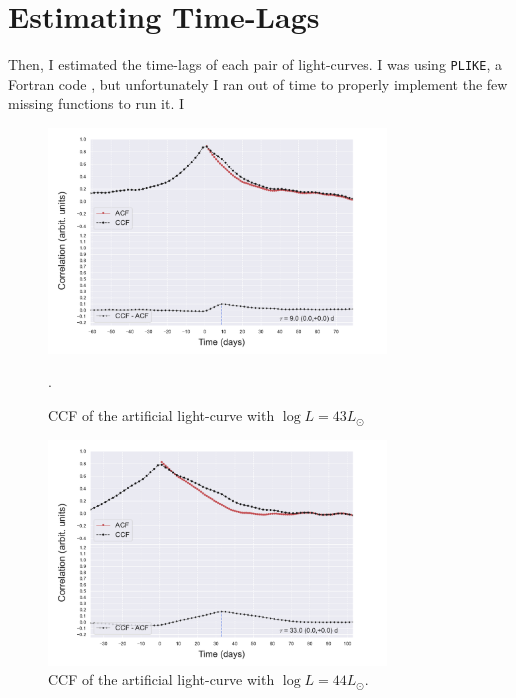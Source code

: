 \documentclass[letterpaper, oneside]{article}
\begin{document}
\section{Estimating Time-Lags}

Then, I estimated the time-lags of each pair of light-curves. I was using \texttt{PLIKE}, a Fortran code \cite{Alexander_2013, tal_alexander_software}, but unfortunately I ran out of time to properly implement the few missing functions to run it. I 

\begin{figure}[h]
	\centering
	\includegraphics[width=0.8\textwidth]{../x_y_bands_43_final.pdf}
	\caption{CCF of the artificial light-curve with $\log L = 43 L_{\odot}$}.
	\label{fig:ccf_art_lcs_L43}
\end{figure}

\begin{figure}[p]
	\centering
	\includegraphics[width=0.8\textwidth]{../x_y_bands_44_final.pdf}
	\caption{CCF of the artificial light-curve with $\log L = 44 L_{\odot}$.}
	\label{fig:ccf_art_lcs_L44}
\end{figure}
\end{document}
